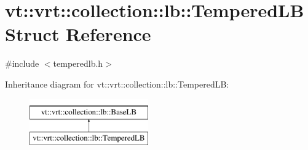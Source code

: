 \hypertarget{structvt_1_1vrt_1_1collection_1_1lb_1_1_tempered_l_b}{}\section{vt\+:\+:vrt\+:\+:collection\+:\+:lb\+:\+:Tempered\+LB Struct Reference}
\label{structvt_1_1vrt_1_1collection_1_1lb_1_1_tempered_l_b}


{\ttfamily \#include $<$temperedlb.\+h$>$}

Inheritance diagram for vt\+:\+:vrt\+:\+:collection\+:\+:lb\+:\+:Tempered\+LB\+:\begin{figure}[H]
\begin{center}
\leavevmode
\includegraphics[height=2.000000cm]{structvt_1_1vrt_1_1collection_1_1lb_1_1_tempered_l_b}
\end{center}
\end{figure}
